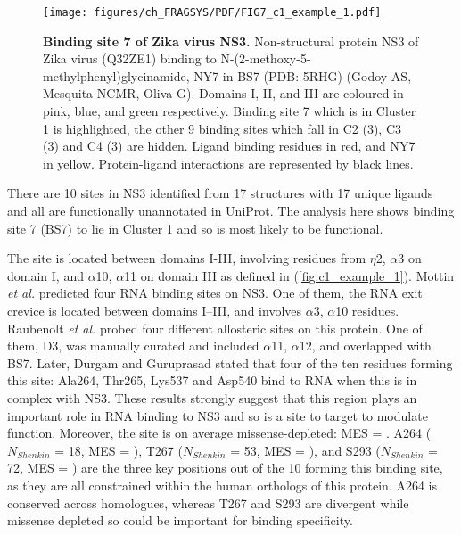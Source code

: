 \begin{figure}[htb!]
    \centering
    \texttt{[image: figures/ch\_FRAGSYS/PDF/FIG7\_c1\_example\_1.pdf]}
    \caption[Binding site 7 of Zika virus NS3]{\textbf{Binding site 7 of Zika virus NS3.} Non-structural protein NS3 of Zika virus (Q32ZE1) binding to N-(2-methoxy-5-methylphenyl)glycinamide, NY7 in BS7 (PDB: 5RHG) (Godoy AS, Mesquita NCMR, Oliva G). Domains I, II, and III are coloured in pink, blue, and green respectively. Binding site 7 which is in Cluster 1 is highlighted, the other 9 binding sites which fall in C2 (3), C3 (3) and C4 (3) are hidden. Ligand binding residues in red, and NY7 in yellow. Protein-ligand interactions are represented by black lines.}
    \label{fig:c1_example_1}
\end{figure}

There are 10 sites in NS3 identified from 17 structures with 17 unique ligands and all are functionally unannotated in UniProt. The analysis here shows binding site 7 (BS7) to lie in Cluster 1 and so is most likely to be functional.

The site is located between domains I-III, involving residues from $\eta$2, $\alpha$3 on domain I, and $\alpha$10, $\alpha$11 on domain III as defined in \cite{TIAN_2016_ZIKV} (\autoref{fig:c1_example_1}). Mottin \textit{et al.} \cite{MOTTIN_2017_ZIKA_HELICASE} predicted four RNA binding sites on NS3. One of them, the RNA exit crevice is located between domains I–III, and involves $\alpha$3, $\alpha$10 residues. Raubenolt \textit{et al.} \cite{RAUBENOLT_2021_ZIKA_ALLOSTERIC} probed four different allosteric sites on this protein. One of them, D3, was manually curated and included $\alpha$11, $\alpha$12, and overlapped with BS7. Later, Durgam and Guruprasad \cite{DURGAM_2022_ZIKA_ATP} stated that four of the ten residues forming this site: Ala264, Thr265, Lys537 and Asp540 bind to RNA when this is in complex with NS3. These results strongly suggest that this region plays an important role in RNA binding to NS3 and so is a site to target to modulate function. Moreover, the site is on average missense-depleted: MES =  . A264 ($N_{Shenkin}$ = 18, MES = ), T267 ($N_{Shenkin}$ = 53, MES = ), and S293 ($N_{Shenkin}$ = 72, MES =  ) are the three key positions out of the 10 forming this binding site, as they are all constrained within the human orthologs of this protein. A264 is conserved across homologues, whereas T267 and S293 are divergent while missense depleted so could be important for binding specificity.


